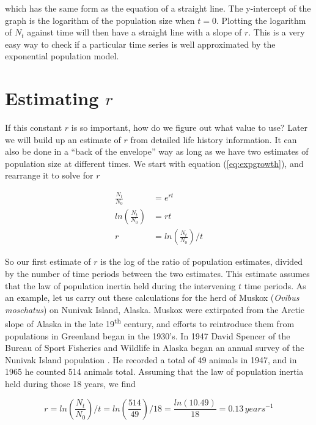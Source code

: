 \documentclass[]{book}
\begin{document}
which has the same form as the equation of a straight line. The
y-intercept of the graph is the logarithm of the population size when
\(t=0\). Plotting the logarithm of \(N_t\) against time will then have a
straight line with a slope of \(r\). This is a very easy way to check if
a particular time series is well approximated by the exponential
population model.

\section{\texorpdfstring{Estimating
\(r\)}{Estimating r}}\label{estimating-r}

If this constant \(r\) is so important, how do we figure out what value
to use? Later we will build up an estimate of \(r\) from detailed life
history information. It can also be done in a ``back of the envelope''
way as long as we have two estimates of population size at different
times. We start with equation (\eqref{eq:expgrowth}), and rearrange it to
solve for \(r\)

\begin{equation}
\begin{split}
\frac{N_t}{N_0} & = e^{rt} \\
ln\left(\frac{N_t}{N_0}\right)  & = rt \\
r & = ln\left(\frac{N_t}{N_0}\right) /  t 
\end{split}
\end{equation}

So our first estimate of \(r\) is the log of the ratio of population
estimates, divided by the number of time periods between the two
estimates. This estimate assumes that the law of population inertia held
during the intervening \(t\) time periods. As an example, let us carry
out these calculations for the herd of Muskox (\emph{Ovibus moschatus})
on Nunivak Island, Alaska. Muskox were extirpated from the Arctic slope
of Alaska in the late 19\textsuperscript{th} century, and efforts to
reintroduce them from populations in Greenland began in the 1930's. In
1947 David Spencer of the Bureau of Sport Fisheries and Wildlife in
Alaska began an annual survey of the Nunivak Island population
\citep{spencer1970muskox}. He recorded a total of 49 animals in 1947,
and in 1965 he counted 514 animals total. Assuming that the law of
population inertia held during those 18 years, we find

\begin{equation}
r = ln\left(\frac{N_t}{N_0}\right) /  t = 
    ln\left(\frac{514}{49}\right)  / 18 = 
    \frac{ln(10.49)}{18} = 0.13 \, years^{-1}
\end{equation}
\end{document}
